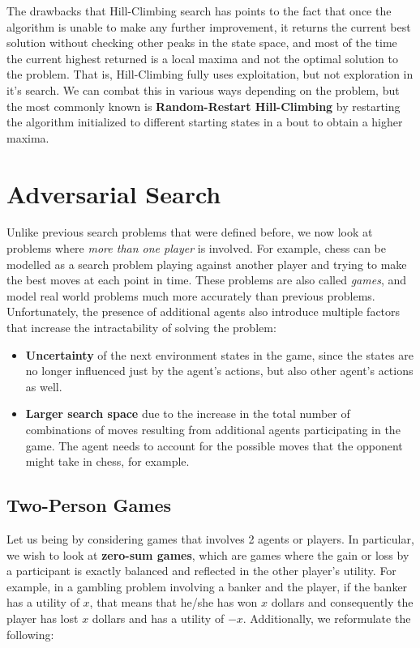 \documentclass[12pt]{article}
\begin{document}
The drawbacks that Hill-Climbing search has points to the fact that once the algorithm is unable to make any further improvement, it returns the current best solution without checking other peaks in the state space, and most of the time the current highest returned is a local maxima and not the optimal solution to the problem. That is, Hill-Climbing fully uses exploitation, but not exploration in it's search. We can combat this in various ways depending on the problem, but the most commonly known is \textbf{Random-Restart Hill-Climbing} by restarting the algorithm initialized to different starting states in a bout to obtain a higher maxima.

\section{Adversarial Search}

Unlike previous search problems that were defined before, we now look at problems where \textit{more than one player} is involved. For example, chess can be modelled as a search problem playing against another player and trying to make the best moves at each point in time. These problems are also called \textit{games}, and model real world problems much more accurately than previous problems.\\

Unfortunately, the presence of additional agents also introduce multiple factors that increase the intractability of solving the problem:

\begin{itemize}
\item \textbf{Uncertainty} of the next environment states in the game, since the states are no longer influenced just by the agent's actions, but also other agent's actions as well.

\item \textbf{Larger search space} due to the increase in the total number of combinations of moves resulting from additional agents participating in the game. The agent needs to account for the possible moves that the opponent might take in chess, for example.
\end{itemize}

\subsection{Two-Person Games}

Let us being by considering games that involves 2 agents or players. In particular, we wish to look at \textbf{zero-sum games}, which are games where the gain or loss by a participant is exactly balanced and reflected in the other player's utility. For example, in a gambling problem involving a banker and the player, if the banker has a utility of $x$, that means that he/she has won $x$ dollars and consequently the player has lost $x$ dollars and has a utility of $-x$. Additionally, we reformulate the following:
\end{document}
